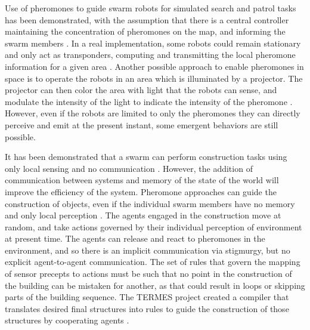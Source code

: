 Use of pheromones to guide swarm robots for simulated search and patrol tasks has been demonstrated, with the assumption that there is a central controller maintaining the concentration of pheromones on the map, and informing the swarm members \citep{coppin2012controlling}. 
In a real implementation, some robots could remain stationary and only act as transponders, computing and transmitting the local pheromone information for a given area \citep{hoff2010two}. 
Another possible approach to enable pheromones in space is to operate the robots in an area which is illuminated by a projector. 
The projector can then color the area with light that the robots can sense, and modulate the intensity of the light to indicate the intensity of the pheromone \citep{arvin2015cosvarphi,diaz2017human}. 
However, even if the robots are limited to only the pheromones they can directly perceive and emit at the present instant, some emergent behaviors are still possible. 


It has been demonstrated that a swarm can perform construction tasks using only local sensing and no communication \citep{wawerla2002collective, bowyer2000automated}.
However, the addition of communication between systems and memory of the state of the world will improve the efficiency of the system.
Pheromone approaches can guide the construction of objects, even if the individual swarm members have no memory and only local perception \citep{mason2003programming}. 
The agents engaged in the construction move at random, and take actions governed by their individual perception of environment at present time. 
The agents can release and react to pheromones in the environment, and so there is an implicit communication via stigmurgy, but no explicit agent-to-agent communication. 
The set of rules that govern the mapping of sensor precepts to actions must be such that no point in the construction of the building can be mistaken for another, as that could result in loops or skipping parts of the building sequence. 
The TERMES project created a compiler that translates desired final structures into rules to guide the construction of those structures by cooperating agents \citep{werfel2014designing}.

